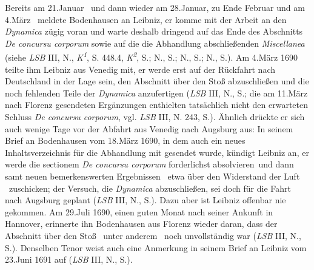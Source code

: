 Bereits am 21.\;Januar \textendash\ und dann wieder am 28.\;Januar, zu Ende Februar und am 4.\;März \textendash\ meldete Bodenhausen an Leibniz, er komme mit der Arbeit an den \textit{Dynamica}\cite{01354} zügig voran und warte deshalb dringend auf das Ende des Abschnitts \textit{De concursu corporum} sowie auf die die Abhandlung abschließenden \textit{Miscellanea} (siehe \textit{LSB} III, N., \textit{K\textsuperscript{1}}, S. 448.4, \textit{K\textsuperscript{2}}, S.;\cite{01386} N., S.;\cite{01387} N., S.;\cite{01388} N., S.\cite{01389}).
Am 4.\;März 1690 teilte ihm Leibniz aus Venedig mit, er werde erst auf der Rückfahrt nach Deutschland in der Lage sein, den Abschnitt über den Stoß abzuschließen und die noch fehlenden Teile der \textit{Dynamica}\cite{01354} anzufertigen (\textit{LSB} III, N., S.;\cite{01390} die am 11.\;März nach Florenz gesendeten Ergänzungen enthielten tatsächlich nicht den erwarteten Schluss \textit{De concursu corporum}, vgl. \textit{LSB} III, N. 243, S.\cite{01391}).
Ähnlich drückte er sich auch wenige Tage vor der Abfahrt aus Venedig nach Augsburg aus: In seinem Brief an Bodenhausen vom 18.\;März 1690, in dem auch ein neues Inhaltsverzeichnis für die Abhandlung mit gesendet wurde, kündigt Leibniz an, er werde die \glqq sectionem \textit{De concursu corporum} forderlichst absolvieren\grqq\ und dann samt neuen bemerkenswerten Ergebnissen \textendash\ etwa über den Widerstand der Luft \textendash\ zuschicken; der Versuch, die \textit{Dynamica}\cite{01354} abzuschließen, sei doch für die Fahrt nach Augsburg geplant (\textit{LSB} III, N., S.).\cite{01392}
Dazu aber ist Leibniz offenbar nie gekommen.
Am 29.\;Juli 1690, einen guten Monat nach seiner Ankunft in Hannover, erinnerte ihn Bodenhausen aus Florenz wieder daran, dass der Abschnitt über den Stoß \textendash\ unter anderem \textendash\ noch unvollständig war (\textit{LSB} III, N., S.).\cite{01393}
Denselben Tenor weist auch eine Anmerkung in seinem Brief an Leibniz vom 23.\;Juni 1691 auf (\textit{LSB} III, N., S.).\cite{01394}

